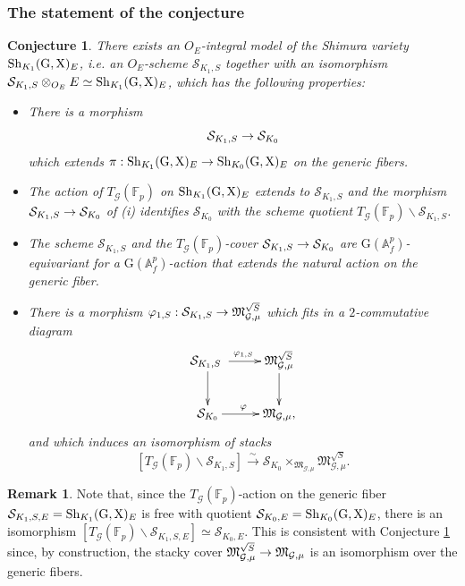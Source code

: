 \documentclass[reqno, 10pt]{amsart}
\makeatletter
\newcommand{\fkM}{\ensuremath{\mathfrak{M}}\xspace}
\newcommand{\BA}{\ensuremath{\mathbb {A}}\xspace}
\newcommand{\BF}{\ensuremath{\mathbb {F}}\xspace}
\newcommand{\CG}{\ensuremath{\mathcal {G}}\xspace}
\newcommand{\CS}{\ensuremath{\mathcal {S}}\xspace}
\newcommand{\RG}{\ensuremath{\mathrm {G}}\xspace}
\newcommand{\RX}{\ensuremath{\mathrm {X}}\xspace}
\newcommand{\bs}{\backslash}
\newtheorem {conjecture}[subsubsection]{Conjecture}
\theoremstyle{definition}
\newtheorem{remark}[subsubsection]{Remark}
\numberwithin{equation}{subsection}
\numberwithin{subsubsection}{subsection}
\renewcommand{\to}{%
   \ifbool{@display}{\longrightarrow}{\rightarrow}%
   }
\makeatother
\begin{document}
  
 
\subsubsection{The statement of the conjecture} 
\begin{conjecture}\label{globconj}
 There exists an $O_E$-integral model  of the Shimura variety 
 ${\rm Sh}_{K_1}(\RG, \RX)_E$, i.e. an $O_E$-scheme $\CS_{K_1, S}$ together with an isomorphism $\CS_{K_1, S}\otimes_{O_E}E\simeq {\rm Sh}_{K_1}(\RG, \RX)_E$,   which has the following properties:
 
 \begin{itemize}
\item[i)] There is a morphism \[\CS_{K_1, S}\to \mathcal \CS_{K_0}
\] which extends $\pi: {\rm Sh}_{K_1}(\RG, \RX)_E\to {\rm Sh}_{K_0}(\RG, \RX)_E$ on the generic fibers.
 
 \item[ii)] The action of $T_\CG(\BF_p)$ on ${\rm Sh}_{K_1 }(\RG, \RX)_E$ extends to $\CS_{K_1, S}$ and the morphism 
 $\CS_{K_1, S}\to \mathcal \CS_{K_0}$ of (i)
  identifies $\CS_{K_0}$ with the scheme quotient $T_\CG(\BF_p)\bs \CS_{K_1, S}$.
 
  \item[iii)] The scheme $\CS_{K_1, S}$ and the $T_\CG(\BF_p)$-cover $\CS_{K_1, S}\to \mathcal \CS_{K_0}$ are $\RG({\BA}_f^p)$-equivariant for a $\RG({\BA}_f^p)$-action that extends the natural action on the generic fiber.
  
  \item[iv)] There is a morphism $\varphi_{1, S}: \CS_{K_1, S}\to \fkM^{\sqrt{S}}_{\CG,\mu}$ which fits  in a $2$-commutative diagram
  \begin{equation}\label{CDconjecture}
\begin{aligned}
 \xymatrix{
     \CS_{K_1, S}\ \ar[r]^{\varphi_{1,S}} \ar[d]  &  \fkM^{\sqrt{S}}_{\CG,\mu} \ar[d] \\
       \CS_{K_0}\ar[r]^{\varphi}  & \fkM_{\CG,\mu},
        }
        \end{aligned}
\end{equation}
 and which induces
   an isomorphism of stacks 
 \[
 [T_\CG(\BF_p)\bs \CS_{K_1, S}]\xrightarrow{\sim}  \CS_{K_0}\times_{\fkM_{\CG,\mu}}\fkM^{\sqrt{S}}_{\CG,\mu }.
 \]
 \end{itemize}
 \end{conjecture} 
 
 \begin{remark}\label{rem:GenericIso}
 Note that, since the $T_\CG(\BF_p)$-action on the generic fiber $\CS_{K_1, S, E}={\rm Sh}_{K_1 }(\RG, \RX)_E$ is free with quotient $\CS_{K_0, E}={\rm Sh}_{K_0}(\RG, \RX)_E$, there is an isomorphism $[T_\CG(\BF_p)\bs \CS_{K_1, S, E}]\simeq \CS_{K_0, E}$. This is consistent with Conjecture \ref{globconj} since, by construction, the stacky cover $\fkM^{\sqrt{S}}_{\CG,\mu}\to \fkM_{\CG,\mu}$ is an isomorphism over the generic fibers. 
 \end{remark}
 
\end{document}
